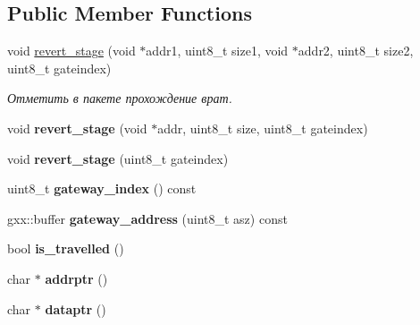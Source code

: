 \subsection*{Public Member Functions}
\begin{DoxyCompactItemize}
\item 
void \hyperlink{structg1_1_1packet_ad49ed95720c1fa6cfaaa090cc656ba0e}{revert\+\_\+stage} (void $\ast$addr1, uint8\+\_\+t size1, void $\ast$addr2, uint8\+\_\+t size2, uint8\+\_\+t gateindex)\hypertarget{structg1_1_1packet_ad49ed95720c1fa6cfaaa090cc656ba0e}{}\label{structg1_1_1packet_ad49ed95720c1fa6cfaaa090cc656ba0e}

\begin{DoxyCompactList}\small\item\em Отметить в пакете прохождение врат. \end{DoxyCompactList}\item 
void {\bfseries revert\+\_\+stage} (void $\ast$addr, uint8\+\_\+t size, uint8\+\_\+t gateindex)\hypertarget{structg1_1_1packet_a1477ce6289dcf4f43fd8f13a1b67dcc2}{}\label{structg1_1_1packet_a1477ce6289dcf4f43fd8f13a1b67dcc2}

\item 
void {\bfseries revert\+\_\+stage} (uint8\+\_\+t gateindex)\hypertarget{structg1_1_1packet_aa874d40c216570159b4ca4e3a1ec9b3e}{}\label{structg1_1_1packet_aa874d40c216570159b4ca4e3a1ec9b3e}

\item 
uint8\+\_\+t {\bfseries gateway\+\_\+index} () const \hypertarget{structg1_1_1packet_a90a155e6bab5bcda6a30197fd9d5be35}{}\label{structg1_1_1packet_a90a155e6bab5bcda6a30197fd9d5be35}

\item 
gxx\+::buffer {\bfseries gateway\+\_\+address} (uint8\+\_\+t asz) const \hypertarget{structg1_1_1packet_a573fc5d020f3722647b960ff7ced4c4c}{}\label{structg1_1_1packet_a573fc5d020f3722647b960ff7ced4c4c}

\item 
bool {\bfseries is\+\_\+travelled} ()\hypertarget{structg1_1_1packet_a0de6bfa7627181490bd91164c33f38e1}{}\label{structg1_1_1packet_a0de6bfa7627181490bd91164c33f38e1}

\item 
char $\ast$ {\bfseries addrptr} ()\hypertarget{structg1_1_1packet_ada96086a5e461e198b226d8457470dcd}{}\label{structg1_1_1packet_ada96086a5e461e198b226d8457470dcd}

\item 
char $\ast$ {\bfseries dataptr} ()\hypertarget{structg1_1_1packet_afec6bda1de0b77ff21f34943daa5e04c}{}\label{structg1_1_1packet_afec6bda1de0b77ff21f34943daa5e04c}


\end{DoxyCompactItemize}
